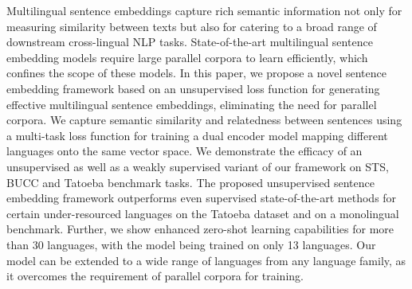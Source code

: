 Multilingual sentence embeddings capture rich semantic information not only for measuring similarity between texts but also for catering to a broad range of downstream cross-lingual NLP tasks. State-of-the-art multilingual sentence embedding models require large parallel corpora to learn efficiently, which confines the scope of these models. In this paper, we propose a novel sentence embedding framework based on an unsupervised loss function for generating effective multilingual sentence embeddings, eliminating the need for parallel corpora. We capture semantic similarity and relatedness between sentences using a multi-task loss function for training a dual encoder model mapping different languages onto the same vector space. We demonstrate the efficacy of an unsupervised as well as a weakly supervised variant of our framework on STS, BUCC and Tatoeba benchmark tasks. The proposed unsupervised sentence embedding framework outperforms even supervised state-of-the-art methods for certain under-resourced languages on the Tatoeba dataset and on a monolingual benchmark. Further, we show enhanced zero-shot learning capabilities for more than 30 languages, with the model being trained on only 13 languages. Our model can be extended to a wide range of languages from any language family, as it overcomes the requirement of parallel corpora for training.
